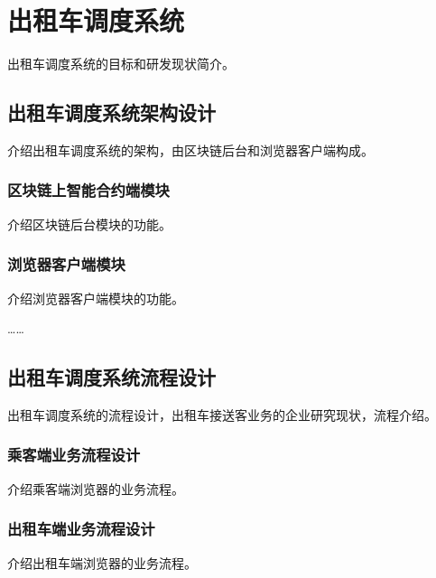 \chapter{出租车调度系统}
出租车调度系统的目标和研发现状简介。
\section{出租车调度系统架构设计}
介绍出租车调度系统的架构，由区块链后台和浏览器客户端构成。
\subsection{区块链上智能合约端模块}
介绍区块链后台模块的功能。
\subsection{浏览器客户端模块}
介绍浏览器客户端模块的功能。


……

\section{出租车调度系统流程设计}
出租车调度系统的流程设计，出租车接送客业务的企业研究现状，流程介绍。
\subsection{乘客端业务流程设计}
介绍乘客端浏览器的业务流程。
\subsection{出租车端业务流程设计}
介绍出租车端浏览器的业务流程。